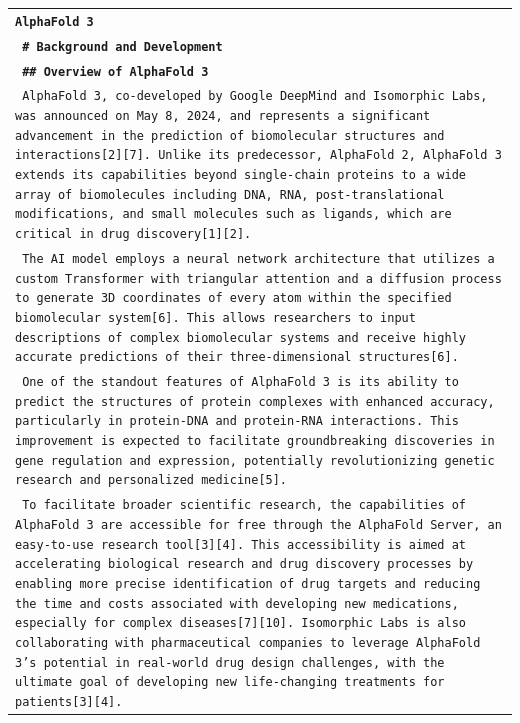 \documentclass[11pt]{article}
\begin{document}
\begin{longtable}{p{\textwidth}}
\toprule
\texttt{\small{\textbf{AlphaFold 3}}} \\
\texttt{\small{\textbf{ \# Background and Development }}} \\
\vspace{1pt}
\texttt{\small{\textbf{ \#\# Overview of AlphaFold 3 }}} \\
\texttt{\small{ AlphaFold 3, co-developed by Google DeepMind and Isomorphic Labs, was announced on May 8, 2024, and represents a significant advancement in the prediction of biomolecular structures and interactions[2][7]. Unlike its predecessor, AlphaFold 2, AlphaFold 3 extends its capabilities beyond single-chain proteins to a wide array of biomolecules including DNA, RNA, post-translational modifications, and small molecules such as ligands, which are critical in drug discovery[1][2]. }} \\
\texttt{\small{ The AI model employs a neural network architecture that utilizes a custom Transformer with triangular attention and a diffusion process to generate 3D coordinates of every atom within the specified biomolecular system[6]. This allows researchers to input descriptions of complex biomolecular systems and receive highly accurate predictions of their three-dimensional structures[6]. }} \\
\texttt{\small{ One of the standout features of AlphaFold 3 is its ability to predict the structures of protein complexes with enhanced accuracy, particularly in protein-DNA and protein-RNA interactions. This improvement is expected to facilitate groundbreaking discoveries in gene regulation and expression, potentially revolutionizing genetic research and personalized medicine[5]. }} \\
\texttt{\small{ To facilitate broader scientific research, the capabilities of AlphaFold 3 are accessible for free through the AlphaFold Server, an easy-to-use research tool[3][4]. This accessibility is aimed at accelerating biological research and drug discovery processes by enabling more precise identification of drug targets and reducing the time and costs associated with developing new medications, especially for complex diseases[7][10]. Isomorphic Labs is also collaborating with pharmaceutical companies to leverage AlphaFold 3's potential in real-world drug design challenges, with the ultimate goal of developing new life-changing treatments for patients[3][4]. }} \\

\end{longtable}
\end{document}

